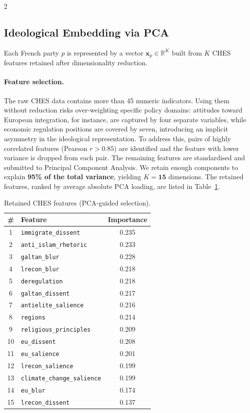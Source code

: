\documentclass[10pt, a4paper]{article}
\begin{document}
\begin{multicols}{2}
\subsection{Ideological Embedding via PCA}
\label{sec:pca}

Each French party $p$ is represented by a vector
$\mathbf{x}_p \in \mathbb{R}^{K}$ built from $K$ CHES features retained
after dimensionality reduction.

\paragraph{Feature selection.}
The raw CHES data contains more than 45 numeric indicators. Using them without
reduction risks over-weighting specific policy domains: attitudes toward
European integration, for instance, are captured by four separate variables,
while economic regulation positions are covered by seven, introducing an
implicit asymmetry in the ideological representation. To address this, pairs
of highly correlated features (Pearson $r > 0.85$) are identified and the
feature with lower variance is dropped from each pair.
The remaining features are standardised and submitted to Principal Component
Analysis.
We retain enough components to explain \textbf{95\% of the total variance},
yielding $K = \mathbf{15}$ dimensions.
The retained features, ranked by average absolute PCA loading, are listed
in Table~\ref{tab:pca}.

\begin{table}[H]
\centering
\caption{Retained CHES features (PCA-guided selection).}
\label{tab:pca}
\scriptsize
\begin{tabular}{clc}
\toprule
\textbf{\#} & \textbf{Feature} & \textbf{Importance} \\
\midrule
1  & \texttt{immigrate\_dissent}        & 0.235 \\
2  & \texttt{anti\_islam\_rhetoric}     & 0.233 \\
3  & \texttt{galtan\_blur}              & 0.228 \\
4  & \texttt{lrecon\_blur}              & 0.218 \\
5  & \texttt{deregulation}              & 0.218 \\
6  & \texttt{galtan\_dissent}           & 0.217 \\
7  & \texttt{antielite\_salience}       & 0.216 \\
8  & \texttt{regions}                   & 0.214 \\
9  & \texttt{religious\_principles}     & 0.209 \\
10 & \texttt{eu\_dissent}               & 0.208 \\
11 & \texttt{eu\_salience}              & 0.201 \\
12 & \texttt{lrecon\_salience}          & 0.199 \\
13 & \texttt{climate\_change\_salience} & 0.199 \\
14 & \texttt{eu\_blur}                  & 0.174 \\
15 & \texttt{lrecon\_dissent}           & 0.137 \\
\bottomrule
\end{tabular}
\end{table}


\end{multicols}
\end{document}
